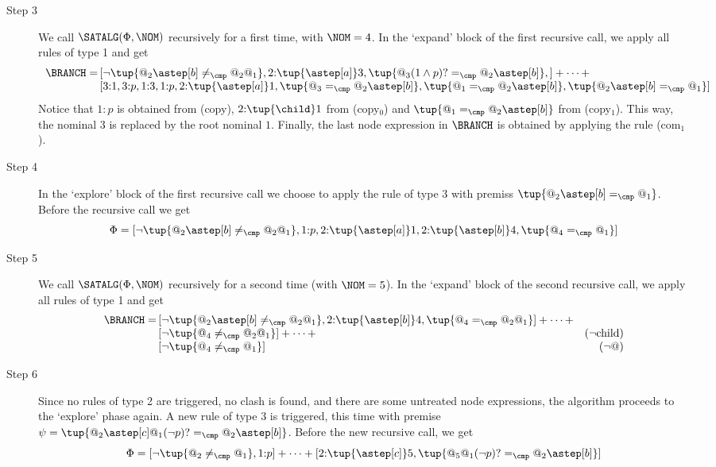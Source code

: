 \begin{exa}
\begin{description}
  \item[Step 3] 
    We call $\SATALG(\Phi,\NOM)$ recursively for a first time, with $\NOM=4$. 
    In the `expand' block of the first recursive call, we apply all rules of type 1 and get
    \[
      \begin{array}{r@{\,}@{}lr}
        \BRANCH = 
          &
          [
            \neg\tup{@_2\astep[b]\neq_\cmp @_2@_1},
            2{:}\tup{\astep[a]}3,
            \tup{@_3(1\land p)? =_\cmp @_2\astep[b]},
          ] + \dots + \\
          &
          [
            3{:}1,3{:}p,1{:}3,1{:}p, 2{:}\tup{\astep[a]}1,
            \tup{@_3 =_\cmp @_2\astep[b]},
            \tup{@_1 =_\cmp @_2\astep[b]},
            \tup{@_2\astep[b]=_\cmp@_1}
          ]
      \end{array}
    \]
    Notice that $1{:}p$ is obtained from (copy), $2{:}\tup{\child}1$ from (copy$_0$) and $\tup{@_1=_\cmp @_2\astep[b]}$ from (copy$_1$). 
    This way, the nominal $3$ is replaced by the root nominal $1$.
    Finally, the last node expression in $\BRANCH$ is obtained by applying the rule (com$_1$).

  \item[Step 4]
    In the `explore' block of the first recursive call we choose to apply the rule of type 3 with premiss $\tup{@_2\astep[b]=_\cmp@_1}$.
    Before the recursive call we get
    \[
      \Phi =
        [
          \neg\tup{@_2\astep[b]\neq_\cmp @_2@_1}, 1{:}p, 2{:}\tup{\astep[a]}1, 2{:}\tup{\astep[b]}4, \tup{@_4 =_{\cmp} @_1}
        ]
    \]

  \item[Step 5]
    We call $\SATALG(\Phi,\NOM)$ recursively for a second time (with $\NOM=5$).
    In the `expand' block of the second recursive call, we apply all rules of type 1 and get
    \[
      \begin{array}{r@{\,}@{}lr}
        \BRANCH = 
            &
            [
              \neg\tup{@_2\astep[b]\neq_\cmp @_2@_1},
              2{:}\tup{\astep[b]}4,
              \tup{@_4 =_{\cmp} @_2@_1}
            ] + \dots + \\
            &
            [
              \neg \tup{@_4 \neq_{\cmp} @_2@_1}
            ] + \dots +
              & \text{($\lnot$child)} \\
            &
            [
              \neg \tup{@_4 \neq_{\cmp} @_1}
            ]
              & \text{($\neg@$)}
      \end{array}
    \]
        

  \item[Step 6] 
    Since no rules of type 2 are triggered, no clash is found, and there are some untreated node expressions, the algorithm proceeds to the `explore' phase again. A new rule of type 3 is triggered, this time with premise $\psi= \tup{@_2\astep[c]@_1(\neg p)? =_\cmp @_2\astep[b]}$. Before the new recursive call, we get
    \[
      \Phi =
        [
          \neg\tup{@_2\neq_{\cmp}@_1}, 1{:}p
        ] 
        + \dots + 
        [
          2{:}\tup{\astep[c]}5, \tup{@_5@_1(\neg p)? =_\cmp @_2\astep[b]} 
        ]
    \]



\end{description}
\end{exa}
